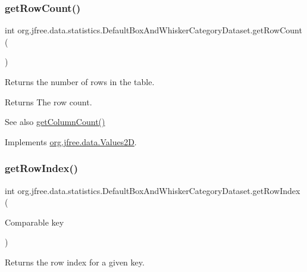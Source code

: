 \subsubsection{\texorpdfstring{get\+Row\+Count()}{getRowCount()}}
{\footnotesize\ttfamily int org.\+jfree.\+data.\+statistics.\+Default\+Box\+And\+Whisker\+Category\+Dataset.\+get\+Row\+Count (\begin{DoxyParamCaption}{ }\end{DoxyParamCaption})}

Returns the number of rows in the table.

\begin{DoxyReturn}{Returns}
The row count.
\end{DoxyReturn}
\begin{DoxySeeAlso}{See also}
\mbox{\hyperlink{classorg_1_1jfree_1_1data_1_1statistics_1_1_default_box_and_whisker_category_dataset_a27063efc7e89bbf851ba362b93b20786}{get\+Column\+Count()}} 
\end{DoxySeeAlso}


Implements \mbox{\hyperlink{interfaceorg_1_1jfree_1_1data_1_1_values2_d_a9ce939b45128515a9841a7d018a6ad0e}{org.\+jfree.\+data.\+Values2D}}.

\mbox{\label{classorg_1_1jfree_1_1data_1_1statistics_1_1_default_box_and_whisker_category_dataset_a0d0e397a4efbd71661d91aed88a2fceb}} 
\subsubsection{\texorpdfstring{get\+Row\+Index()}{getRowIndex()}}
{\footnotesize\ttfamily int org.\+jfree.\+data.\+statistics.\+Default\+Box\+And\+Whisker\+Category\+Dataset.\+get\+Row\+Index (\begin{DoxyParamCaption}\item[{Comparable}]{key }\end{DoxyParamCaption})}

Returns the row index for a given key.


